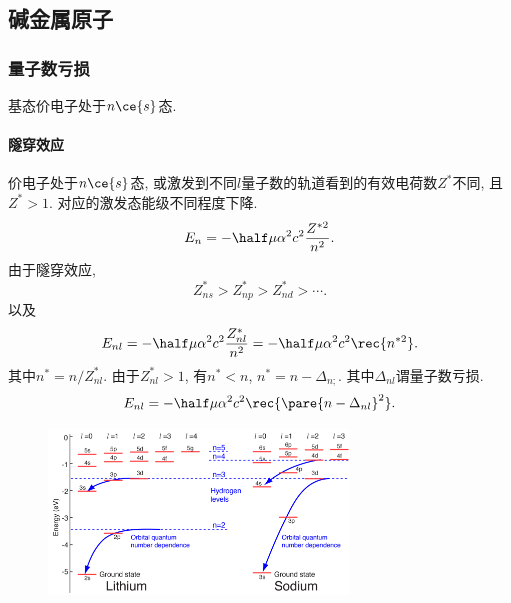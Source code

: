 \documentclass[hidelinks]{ctexart}
\begin{document}


\subsection{碱金属原子} %
\label{sub:碱金属原子}

\subsubsection{量子数亏损} %
\label{ssub:量子数亏损}

基态价电子处于$n\ce{s}$态.

\paragraph{隧穿效应} %
\label{par:隧穿效应}

价电子处于$n\ce{s}$态, 或激发到不同$l$量子数的轨道看到的有效电荷数$Z^*$不同, 且$Z^*>1$. 对应的激发态能级不同程度下降.
\[ E_n = -\half \mu \alpha^2 c^2 \frac{Z^{*2}}{n^2}. \]
由于隧穿效应,
\[ Z^*_{ns} > Z^*_{np} > Z^*_{nd} > \cdots. \]
以及
\[ E_{nl} = -\half \mu\alpha^2 c^2 \frac{Z^*_{nl}}{n^2} = -\half \mu \alpha^2c^2 \rec{n^{*2}}. \]
其中$\displaystyle n^* = n/Z_{nl}^*$. 由于$Z^*_{nl} > 1$, 有$n^* < n$, $n^* = n - \Delta_{n;}$. 其中$\Delta_{nl}$谓量子数亏损.
\[ E_{nl} = -\half \mu\alpha^2c^2 \rec{\pare{n-\Delta_{nl}}^2}. \]
\begin{figure}[ht]
    \centering
    \includegraphics[width=8cm]{src/LevelComp.png}
\end{figure}




\end{document}
